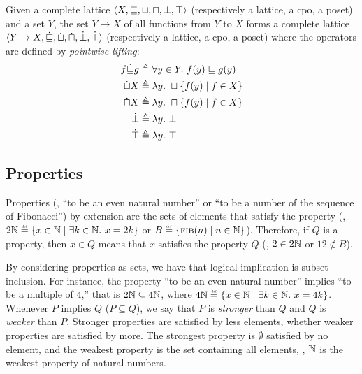 \begin{definition}
  Given a complete lattice $\langle X, \sqsubseteq, \sqcup, \sqcap, \bot, \top \rangle$ (respectively a lattice, a cpo, a poset) and a set $Y$, the set $Y \to X$ of all functions from $Y$ to $X$ forms a complete lattice $\langle Y \to X, \dot{\sqsubseteq}, \dot{\sqcup}, \dot{\sqcap}, \dot{\bot}, \dot{\top} \rangle$ (respectively a lattice, a cpo, a poset) where the operators are defined by \emph{pointwise lifting}:
\begin{align*}
  f \dot{\sqsubseteq} g & \triangleq \forall y \in Y.~ f(y) \sqsubseteq g(y) \\
  \dot{\sqcup} X & \triangleq \lambda y.~ \sqcup \{f(y) \mid f \in X\} \\
  \dot{\sqcap} X & \triangleq \lambda y.~ \sqcap \{f(y) \mid f \in X\} \\
  \dot{\bot} & \triangleq \lambda y.~ \bot \\
  \dot{\top} & \triangleq \lambda y.~ \top
\end{align*}
\end{definition}


\subsection{Properties}

Properties (\eg, ``to be an even natural number'' or ``to be a number of the sequence of Fibonacci'') by extension are the sets of elements that satisfy the property (\eg, $2\N \defeq \setdef{x \in \N}{\exists k \in \N.\spacer x = 2k}$ or $B \defeq \setdef{\textsc{fib}(n)}{n\in\N}$). Therefore, if $Q$ is a property, then $x \in Q$ means that $x$ satisfies the property $Q$ (\eg, $2 \in 2\mathbb{N}$ or $12 \notin B$).

By considering properties as sets, we have that logical implication is subset inclusion. For instance, the property ``to be an even natural number'' implies ``to be a multiple of $4$,'' that is $2\mathbb{N} \subseteq 4\mathbb{N}$, where $4\N \defeq \setdef{x \in \N}{\exists k \in \N.\spacer x = 4k}$.
Whenever $P$ implies $Q$ ($P \subseteq Q$), we say that $P$ is \emph{stronger} than $Q$ and $Q$ is \emph{weaker} than $P$.
Stronger properties are satisfied by less elements, whether weaker properties are satisfied by more.
The strongest property is $\emptyset$ satisfied by no element, and the weakest property is the set containing all elements, \eg, $\mathbb{N}$ is the weakest property of natural numbers.


